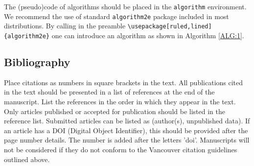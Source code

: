 \documentclass{fundam}
\begin{document}
The (pseudo)code of algorithms should be placed in the \verb!algorithm! environment. We recommend the use of standard \verb!algorithm2e! package included in most  \LaTeXe  distributions.  By calling in the preamble \verb!\usepackage[ruled,lined]{algorithm2e}!  one can introduce an algorithm as shown in Algorithm \ref{ALG:1}.

%




\subsection{Bibliography}

Place citations as numbers in square brackets in the text. All publications cited in the text should be presented in a list of references at the end of the manuscript. List the references in the order in which they appear in the text. Only articles published or accepted for publication should be listed in the reference list. Submitted articles can be listed as (author(s), unpublished data). If an article has a DOI (Digital Object Identifier), this should be provided after the page number details. The number is added after the letters 'doi'. Manuscripts will not be considered if they do not conform to the Vancouver citation guidelines outlined above.
\end{document}
